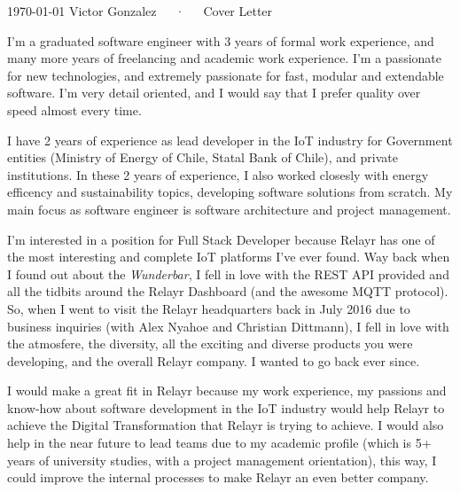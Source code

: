 \documentclass[11pt, letterpaper]{awesome-cv}
\begin{document}
\makecvheader[C]

\makecvfooter
  {\today}
  {Victor Gonzalez~~~·~~~Cover Letter}
  {}

\makelettertitle

\begin{cvletter}

I'm a graduated software engineer with 3 years of formal work experience, and many more years of freelancing and academic work experience. I'm a passionate for new technologies, and extremely passionate for fast, modular and extendable software. I'm very detail oriented, and I would say that I prefer quality over speed almost every time.

I have 2 years of experience as lead developer in the IoT industry for Government entities (Ministry of Energy of Chile, Statal Bank of Chile), and private institutions. In these 2 years of experience, I also worked closesly with energy efficency and sustainability topics, developing software solutions from scratch. My main focus as software engineer is software architecture and project management.

I'm interested in a position for Full Stack Developer because Relayr has one of the most interesting and complete IoT platforms I've ever found. Way back when I found out about the \emph{Wunderbar}, I fell in love with the REST API provided and all the tidbits around the Relayr Dashboard (and the awesome MQTT protocol). So, when I went to visit the Relayr headquarters back in July 2016 due to business inquiries (with Alex Nyahoe and Christian Dittmann), I fell in love with the atmosfere, the diversity, all the exciting and diverse products you were developing, and the overall Relayr company. I wanted to go back ever since.

I would make a great fit in Relayr because my work experience, my passions and know-how about software development in the IoT industry would help Relayr to achieve the Digital Transformation that Relayr is trying to achieve. I would also help in the near future to lead teams due to my academic profile (which is 5+ years of university studies, with a project management orientation), this way, I could improve the internal processes to make Relayr an even better company. 

\end{cvletter}


\makeletterclosing
\end{document}
